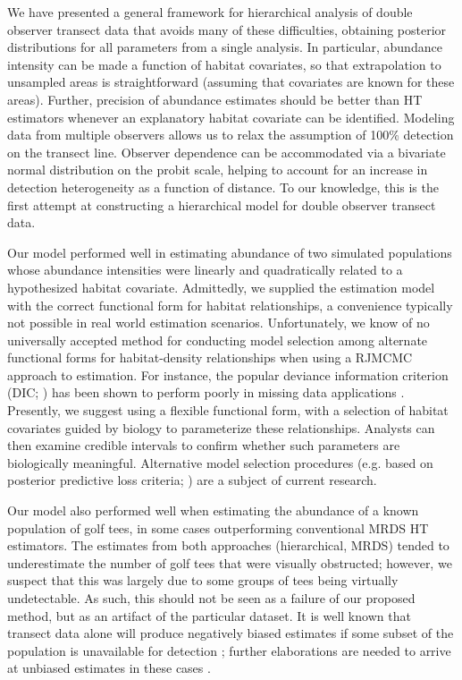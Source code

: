 \documentclass[10pt]{article}
\begin{document}
We have presented a general framework for hierarchical analysis of double observer transect data that avoids many of these difficulties, obtaining posterior distributions for all parameters from a single analysis.  In particular, abundance intensity can be made a function of habitat covariates, so that extrapolation to unsampled areas is straightforward (assuming that covariates are known for these areas).  Further, precision of abundance estimates should be better than HT estimators whenever an explanatory habitat covariate can be identified.  Modeling data from multiple observers allows us to relax the assumption of 100\% detection on the transect line.  Observer dependence can be accommodated via a bivariate normal distribution on the probit scale, helping to account for an increase in detection heterogeneity as a function of distance.  To our knowledge, this is the first attempt at constructing a hierarchical model for double observer transect data.

Our model performed well in estimating abundance of two simulated populations whose abundance intensities were linearly and quadratically related to a hypothesized habitat covariate.  Admittedly, we supplied the estimation model with the correct functional form for habitat relationships, a convenience typically not possible in real world estimation scenarios.  Unfortunately, we know of no universally accepted method for conducting model selection among alternate functional forms for habitat-density relationships when using a RJMCMC approach to estimation.  For instance, the popular deviance information criterion (DIC; \cite{SpiegelhalterEtAl2002}) has been shown to perform poorly in missing data applications \cite{Celeux2006}.  Presently, we suggest using a flexible functional form, with a selection of habitat covariates guided by biology to parameterize these relationships.  Analysts can then examine credible intervals to confirm whether such parameters are biologically meaningful.  Alternative model selection procedures (e.g. based on posterior predictive loss criteria; \cite{GelfandGhosh1998}) are a subject of current research.

Our model also performed well when estimating the abundance of a known population of golf tees, in some cases outperforming conventional MRDS HT estimators.  The estimates from both approaches (hierarchical, MRDS) tended to underestimate the number of golf tees that were visually obstructed; however, we suspect that this was largely due to some groups of tees being virtually undetectable.  As such, this should not be seen as a failure of our proposed method, but as an artifact of the particular dataset.  It is well known that transect data alone will produce negatively biased estimates if some subset of the population is unavailable for detection \cite{McLaren1961}; further elaborations are needed to arrive at unbiased estimates in these cases \cite{Marsh1989,Bengtson2005,DiefenbachEtAl2007}.
\end{document}
